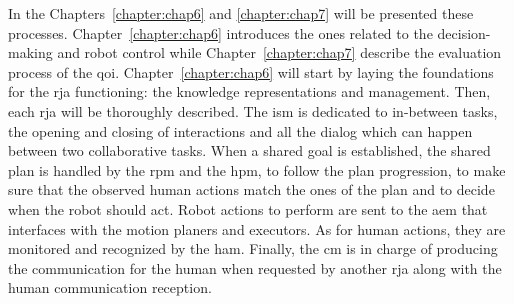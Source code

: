\documentclass[a4paper,11pt,twoside]{StyleThese}
\begin{document}
In the Chapters~\ref{chapter:chap6} and \ref{chapter:chap7} will be presented these processes. Chapter~\ref{chapter:chap6} introduces the ones related to the decision-making and robot control while Chapter~\ref{chapter:chap7} describe the evaluation process of the \acrlong{qoi}. Chapter~\ref{chapter:chap6} will start by laying the foundations for the \acrshort{rja} functioning: the knowledge representations and management. Then, each \acrshort{rja} will be thoroughly described. The \acrfull{ism} is dedicated to in-between tasks, \ie the opening and closing of interactions and all the dialog which can happen between two collaborative tasks. When a shared goal is established, the shared plan is handled by the \acrfull{rpm} and the \acrfull{hpm}, \ie to follow the plan progression, to make sure that the observed human actions match the ones of the plan and to decide when the robot should act. Robot actions to perform are sent to the \acrfull{aem} that interfaces with the motion planers and executors. As for human actions, they are monitored and recognized by the \acrfull{ham}. Finally, the \acrfull{cm} is in charge of producing the communication for the human when requested by another \acrshort{rja} along with the human communication reception.




\ifdefined{}
\else


\end{document}
